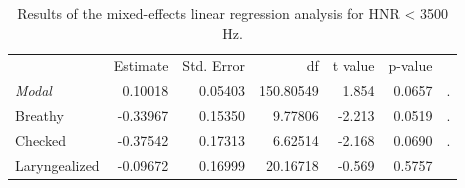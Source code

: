\documentclass[12pt, letterpaper]{article}
\providecommand{\lsptoprule}{\midrule\toprule}
\providecommand{\lspbottomrule}{\bottomrule\midrule}
\begin{document}
\begin{table}[!h]
    \centering
    \caption{Results of the mixed-effects linear regression analysis for HNR < 3500 Hz.}
    \label{tab:HNR35}
    \begin{tabular}{lrrrrrl}
	\lsptoprule
					&  Estimate  & Std. Error & df & t value & p-value & \\
        \textit{Modal}  &   0.10018  &  0.05403 & 150.80549 &  1.854 &  0.0657 & . \\  
  	Breathy   		&  -0.33967  &  0.15350 &  9.77806  &-2.213 &  0.0519 & . \\
	Checked    		&  -0.37542  &  0.17313 &  6.62514  &-2.168 &  0.0690 & . \\
	Laryngealized	&  -0.09672  &  0.16999 & 20.16718  &-0.569 &  0.5757 & \\
    \lspbottomrule
    \end{tabular}
\end{table}

\end{document}
